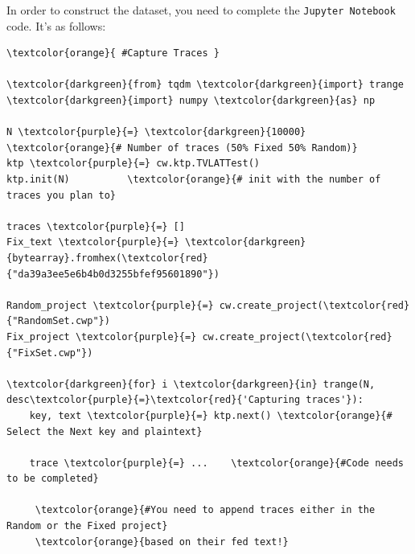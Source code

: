 \documentclass[11pt]{article}
\begin{document}
\noindent In order to construct the dataset, you need to complete the \texttt{Jupyter Notebook} code. It's as follows: 

\begin{small} 
\begin{tcolorbox}
\begin{Verbatim}[commandchars=\\\{\}]
\textcolor{orange}{ #Capture Traces }

\textcolor{darkgreen}{from} tqdm \textcolor{darkgreen}{import} trange
\textcolor{darkgreen}{import} numpy \textcolor{darkgreen}{as} np

N \textcolor{purple}{=} \textcolor{darkgreen}{10000}  \textcolor{orange}{# Number of traces (50% Fixed 50% Random)}
ktp \textcolor{purple}{=} cw.ktp.TVLATTest()
ktp.init(N)          \textcolor{orange}{# init with the number of traces you plan to}

traces \textcolor{purple}{=} []
Fix_text \textcolor{purple}{=} \textcolor{darkgreen}{bytearray}.fromhex(\textcolor{red}{"da39a3ee5e6b4b0d3255bfef95601890"})

Random_project \textcolor{purple}{=} cw.create_project(\textcolor{red}{"RandomSet.cwp"})
Fix_project \textcolor{purple}{=} cw.create_project(\textcolor{red}{"FixSet.cwp"})

\textcolor{darkgreen}{for} i \textcolor{darkgreen}{in} trange(N, desc\textcolor{purple}{=}\textcolor{red}{'Capturing traces'}):
    key, text \textcolor{purple}{=} ktp.next() \textcolor{orange}{# Select the Next key and plaintext}
   
    trace \textcolor{purple}{=} ...    \textcolor{orange}{#Code needs to be completed}
    
     \textcolor{orange}{#You need to append traces either in the Random or the Fixed project}
     \textcolor{orange}{based on their fed text!}
\end{Verbatim}
\end{tcolorbox}
\end{small} 

  
\end{document}
